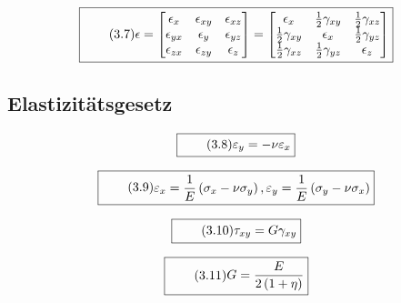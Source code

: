 \documentclass[11pt]{article}
\newcommand{\1}{ {\mathds{1}} }
\begin{document}
\begin{multicols}{2}
		\begin{equation}
			\boxed{
				\tag{3.7}
				\begin{split}
					\mathbf{\epsilon}
					=
					\begin{bmatrix}
						\epsilon_{x } & \epsilon_{xy} & \epsilon_{xz} \\
						\epsilon_{yx} & \epsilon_{y } & \epsilon_{yz} \\
						\epsilon_{zx} & \epsilon_{zy} & \epsilon_{z } 
					\end{bmatrix}
					=
					\begin{bmatrix}
						\epsilon_x & \frac{1}{2}\gamma_{xy} & \frac{1}{2}\gamma_{xz}\\
						\frac{1}{2}\gamma_{xy} & \epsilon_x & \frac{1}{2}\gamma_{yz}\\
						\frac{1}{2}\gamma_{xz} & \frac{1}{2}\gamma_{yz} & \epsilon_z
					\end{bmatrix}
				\end{split}
			}
		\end{equation}

		\subsection{Elastizitätsgesetz}

		\begin{equation}
			\boxed{
				\tag{3.8}
				\begin{split}
			\varepsilon_y = -\nu \varepsilon_x
				\end{split}
			}
		\end{equation}

		\begin{equation}
			\boxed{
				\tag{3.9}
				\begin{split}
			\varepsilon_x = \frac{1}{E} \left( \sigma_x - \nu\sigma_y \right), 
			\varepsilon_y = \frac{1}{E} \left( \sigma_y - \nu\sigma_x \right)
				\end{split}
			}
		\end{equation}

		\begin{equation}
			\boxed{
				\tag{3.10}
				\begin{split}
			\tau_{xy} = G \gamma_{xy}
				\end{split}
			}
		\end{equation}

		\begin{equation}
			\boxed{
				\tag{3.11}
				\begin{split}
					G = \frac{E}{2\left(1+\eta\right)}
				\end{split}
			}
		\end{equation}


\end{multicols}
\end{document}
